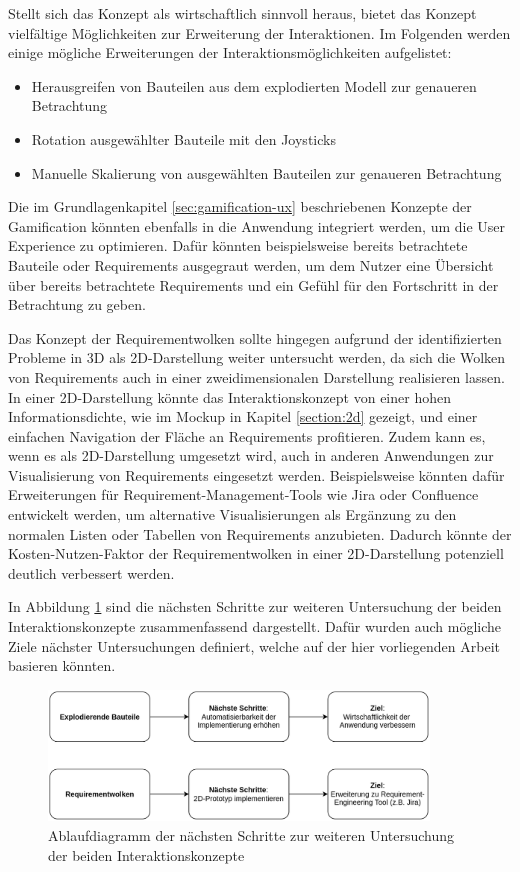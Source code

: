 Stellt sich das Konzept als wirtschaftlich sinnvoll heraus, bietet das Konzept vielfältige Möglichkeiten zur Erweiterung der Interaktionen.
Im Folgenden werden einige mögliche Erweiterungen der Interaktionsmöglichkeiten aufgelistet:
\begin{itemize}
    \item Herausgreifen von Bauteilen aus dem explodierten Modell zur genaueren Betrachtung
    \item Rotation ausgewählter Bauteile mit den Joysticks
    \item Manuelle Skalierung von ausgewählten Bauteilen zur genaueren Betrachtung
\end{itemize}

Die im Grundlagenkapitel \ref{sec:gamification-ux} beschriebenen Konzepte der Gamification könnten ebenfalls in die Anwendung integriert werden, um die User Experience zu optimieren.
Dafür könnten beispielsweise bereits betrachtete Bauteile oder Requirements ausgegraut werden, um dem Nutzer eine Übersicht über bereits betrachtete Requirements und ein Gefühl für den \glqq{}Fortschritt\grqq{} in der Betrachtung zu geben.

Das Konzept der Requirementwolken sollte hingegen aufgrund der identifizierten Probleme in 3D als 2D-Darstellung weiter untersucht werden, da sich die Wolken von Requirements auch in einer zweidimensionalen Darstellung realisieren lassen.
In einer 2D-Darstellung könnte das Interaktionskonzept von einer hohen Informationsdichte, wie im Mockup in Kapitel \ref{section:2d} gezeigt, und einer einfachen Navigation der Fläche an Requirements profitieren.
Zudem kann es, wenn es als 2D-Darstellung umgesetzt wird, auch in anderen Anwendungen zur Visualisierung von Requirements eingesetzt werden.
Beispielsweise könnten dafür Erweiterungen für Requirement-Management-Tools wie Jira oder Confluence entwickelt werden, um alternative Visualisierungen als Ergänzung zu den normalen Listen oder Tabellen von Requirements anzubieten.
Dadurch könnte der Kosten-Nutzen-Faktor der Requirementwolken in einer 2D-Darstellung potenziell deutlich verbessert werden.

\newpage

In Abbildung \ref{fig:ausblick-ablauf} sind die nächsten Schritte zur weiteren Untersuchung der beiden Interaktionskonzepte zusammenfassend dargestellt.
Dafür wurden auch mögliche Ziele nächster Untersuchungen definiert, welche auf der hier vorliegenden Arbeit basieren könnten. 

\begin{figure}[H]
    \centering
    \includegraphics[width=0.9\textwidth]{images/AusblickAblaufdiagramm.png}
    \caption{Ablaufdiagramm der nächsten Schritte zur weiteren Untersuchung der beiden Interaktionskonzepte}
    \label{fig:ausblick-ablauf}
\end{figure}

